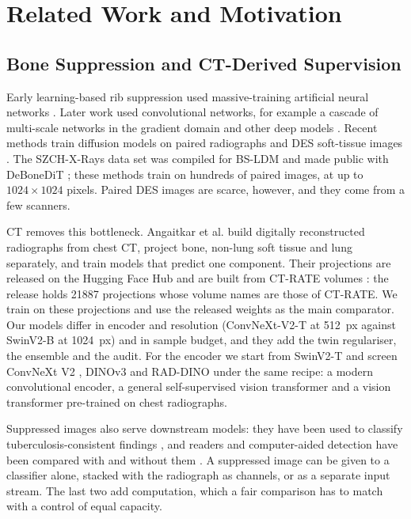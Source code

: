 \section{Related Work and Motivation}
\label{sec:related}

\subsection{Bone Suppression and CT-Derived Supervision}
\label{sec:rw-bone}
Early learning-based rib suppression used massive-training artificial neural networks \cite{suzuki2006mtann}. Later work used
convolutional networks, for example a cascade of multi-scale networks in the gradient domain \cite{yang2017cascade} and other deep models
\cite{gusarev2017deep}. Recent methods train diffusion models on paired radiographs and DES soft-tissue images
\cite{chen2024bsdiff,sun2026bsldm,sun2025gllcm,sun2026debonedit}. The SZCH-X-Rays data set was compiled for BS-LDM \cite{sun2026bsldm}
and made public with DeBoneDiT \cite{sun2026debonedit}; these methods train on hundreds of paired images, at up to $1024\times1024$
pixels. Paired DES images are scarce, however, and they come from a few scanners.

CT removes this bottleneck. Angaitkar et al. \cite{angaitkar2026anatomy} build digitally reconstructed radiographs from chest CT, project
bone, non-lung soft tissue and lung separately, and train models that predict one component. Their projections are released on the
Hugging Face Hub and are built from CT-RATE volumes \cite{hamamci2026ctrate}: the release holds \num{21887} projections whose volume names
are those of CT-RATE. We train on these projections and use the released weights as the main comparator. Our models differ in encoder and
resolution (ConvNeXt-V2-T at 512~px against SwinV2-B at 1024~px) and in sample budget, and they add the twin regulariser, the ensemble
and the audit. For the encoder we start from SwinV2-T \cite{liu2022swinv2} and screen ConvNeXt V2 \cite{woo2023convnextv2}, DINOv3
\cite{simeoni2025dinov3} and RAD-DINO \cite{perezgarcia2025raddino} under the same recipe: a modern convolutional encoder, a general
self-supervised vision transformer and a vision transformer pre-trained on chest radiographs.

Suppressed images also serve downstream models: they have been used to classify tuberculosis-consistent findings
\cite{rajaraman2021bone}, and readers and computer-aided detection have been compared with and without them
\cite{freedman2011lung,schalekamp2014cad}. A suppressed image can be given to a classifier alone, stacked with the radiograph as
channels, or as a separate input stream. The last two add computation, which a fair comparison has to match with a control of equal
capacity.

